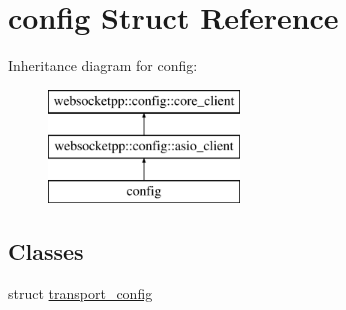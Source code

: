 \hypertarget{classconfig}{}\section{config Struct Reference}
\label{classconfig}
Inheritance diagram for config\+:\begin{figure}[H]
\begin{center}
\leavevmode
\includegraphics[height=3.000000cm]{classconfig}
\end{center}
\end{figure}
\subsection*{Classes}
\begin{DoxyCompactItemize}
\item 
struct \hyperlink{structconfig_1_1transport__config}{transport\+\_\+config}
\end{DoxyCompactItemize}
